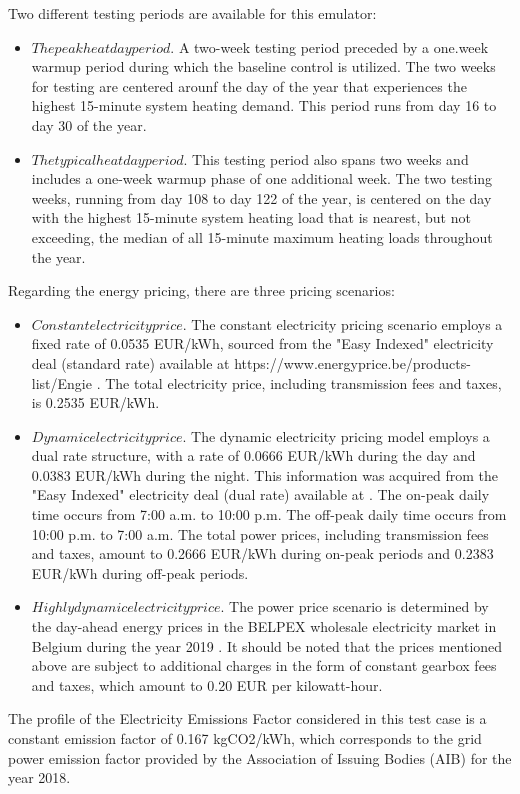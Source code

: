 Two different testing periods are available for this emulator:
\begin{itemize}
    \item $The peak heat day period$. A two-week testing period preceded by a one.week warmup period during which the baseline control is utilized. The two weeks for testing are centered arounf the day of the year that experiences the highest 15-minute system heating demand. This period runs from day 16 to day 30 of the year.
    \item $The typical heat day period$. This testing period also spans two weeks and includes a one-week warmup phase of one additional week. The two testing weeks, running from day 108 to day 122 of the year, is centered on the day with the highest 15-minute system heating load that is nearest, but not exceeding, the median of all 15-minute maximum heating loads throughout the year.
\end{itemize}
Regarding the energy pricing, there are three pricing scenarios: 
\begin{itemize}
    \item $Constant electricity price$. The constant electricity pricing scenario employs a fixed rate of 0.0535 EUR/kWh, sourced from the "Easy Indexed" electricity deal (standard rate) available at https://www.energyprice.be/products-list/Engie \cite{Engie}.  The total electricity price, including transmission fees and taxes, is 0.2535 EUR/kWh.
    \item $Dynamic electricity price$. The dynamic electricity pricing model employs a dual rate structure, with a rate of 0.0666 EUR/kWh during the day and 0.0383 EUR/kWh during the night. This information was acquired from the "Easy Indexed" electricity deal (dual rate) available at \cite{Engie}.   The on-peak daily time occurs from 7:00 a.m. to 10:00 p.m.   The off-peak daily time occurs from 10:00 p.m. to 7:00 a.m.  The total power prices, including transmission fees and taxes, amount to 0.2666 EUR/kWh during on-peak periods and 0.2383 EUR/kWh during off-peak periods.
    \item $Highly dynamic electricity price$. The power price scenario is determined by the day-ahead energy prices in the BELPEX wholesale electricity market in Belgium during the year 2019 \cite{Elexys}.  It should be noted that the prices mentioned above are subject to additional charges in the form of constant gearbox fees and taxes, which amount to 0.20 EUR per kilowatt-hour.
\end{itemize} 
The profile of the Electricity Emissions Factor considered in this test case is a constant emission factor of 0.167 kgCO2/kWh, which corresponds to the grid power emission factor provided by the Association of Issuing Bodies (AIB) for the year 2018. 

